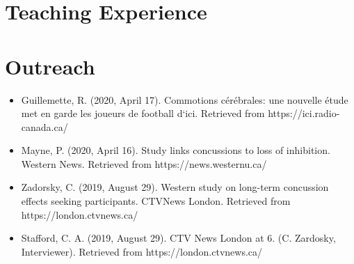 \documentclass[letterpaper]{twentysecondcv} %
\begin{document}

\section{Teaching Experience}

\begin{twenty} %
\end{twenty}


\section{Outreach}

\begin{itemize}
	\item Guillemette, R. (2020, April 17). Commotions c\'er\'ebrales: une nouvelle \'etude met en garde les joueurs de football d`ici. \newline
	Retrieved from https://ici.radio-canada.ca/
	\item Mayne, P. (2020, April 16). Study links concussions to loss of inhibition. Western News. Retrieved from https://news.westernu.ca/
	\item Zadorsky, C. (2019, August 29). Western study on long-term concussion effects seeking participants. CTVNews London. \newline
	Retrieved from https://london.ctvnews.ca/
	\item Stafford, C. A. (2019, August 29). CTV News London at 6. (C. Zardosky, Interviewer). Retrieved from https://london.ctvnews.ca/
\end{itemize}


\end{document}
